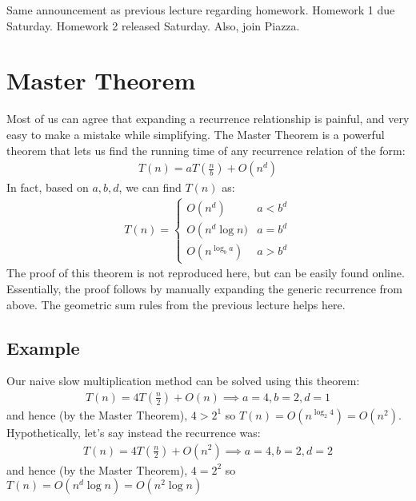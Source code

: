 \documentclass[14pt]{extarticle}
\begin{document}
	\MakeScribeTop

    Same announcement as previous lecture regarding homework. Homework 1 
    due Saturday. Homework 2 released Saturday. Also, join Piazza.\\

    \section{Master Theorem}
    Most of us can agree that expanding a recurrence relationship is painful,
    and very easy to make a mistake while simplifying. The Master Theorem is
    a powerful theorem that lets us find the running time of any recurrence
    relation of the form:
    \begin{align*}
        T(n) = aT\left(\frac{n}{b}\right) + O\left(n^d\right)
    \end{align*}
    In fact, based on $a, b, d$, we can find $T(n)$ as:
    \begin{align*}
        T(n) = \begin{cases}
            O\left(n^d\right)           & a < b^d      \\
            O\left(n^d\log n)           & a = b^d      \\
            O\left(n^{\log_b a}\right)  & a > b^d
        \end{cases}
    \end{align*}
    The proof of this theorem is not reproduced here, but can be easily
    found online. Essentially, the proof follows by manually expanding the
    generic recurrence from above. The geometric sum rules from the previous
    lecture helps here.

    \subsection{Example}
    Our naive slow multiplication method can be solved using this theorem:
    \begin{align*}
        T(n) = 4T\left(\frac{n}{2}\right) + O(n) \implies a = 4, b = 2, d = 1
    \end{align*}
    and hence (by the Master Theorem), $4 > 2^1$ so $T(n) = O(n^{\log_2 4})
    = O(n^2)$.\\

    Hypothetically, let's say instead the recurrence was:
    \begin{align*}
        T(n) = 4T\left(\frac{n}{2}\right) + O(n^2) \implies a = 4, b = 2, d = 2
    \end{align*}
    and hence (by the Master Theorem), $4 = 2^2$ so $T(n) = O(n^d\log n)
    = O(n^2\log n)$
\end{document}
